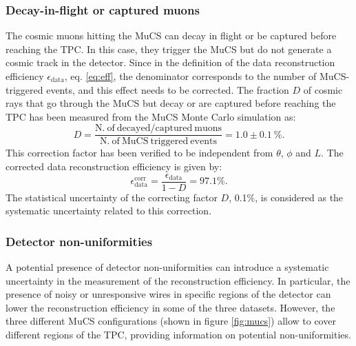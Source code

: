 \documentclass[a4paper,11pt]{article}
\begin{document}
\subsubsection{Decay-in-flight or captured muons}\label{sec:dif}
The cosmic muons hitting the MuCS can decay in flight or be captured before reaching the TPC. In this case, they trigger the MuCS but do not generate a cosmic track in the detector. Since in the definition of the data reconstruction efficiency $\epsilon_{\mathrm{data}}$, eq. \eqref{eq:eff}, the denominator corresponds to the number of MuCS-triggered events, and this effect needs to be corrected. The fraction $D$ of cosmic rays that go through the MuCS but decay or are captured before reaching the TPC has been measured from the MuCS Monte Carlo simulation as:
\begin{equation}
D = \frac{\mathrm{N.~of~decayed/captured~muons}}{\mathrm{N.~of~MuCS~triggered~events}} = 1.0 \pm 0.1~\%.
\end{equation}
This correction factor has been verified to be independent from $\theta$, $\phi$ and $L$. The corrected data reconstruction efficiency is given by:
\begin{equation}
\epsilon_{\mathrm{data}}^{\mathrm{corr}} =  \frac{\epsilon_{\mathrm{data}}}{1-D} = 97.1\%.
\end{equation}
The statistical uncertainty of the correcting factor $D$, 0.1\%, is considered as the systematic uncertainty related to this correction.

\subsubsection{Detector non-uniformities}\label{sec:wires}
A potential presence of detector non-uniformities can introduce a systematic uncertainty in the measurement of the reconstruction efficiency. In particular, the presence of noisy or unresponsive wires in specific regions of the detector can lower the reconstruction efficiency in some of the three datasets. However, the three different MuCS configurations (shown in figure \ref{fig:mucs}) allow to cover different regions of the TPC, providing information on potential non-uniformities.
\end{document}
